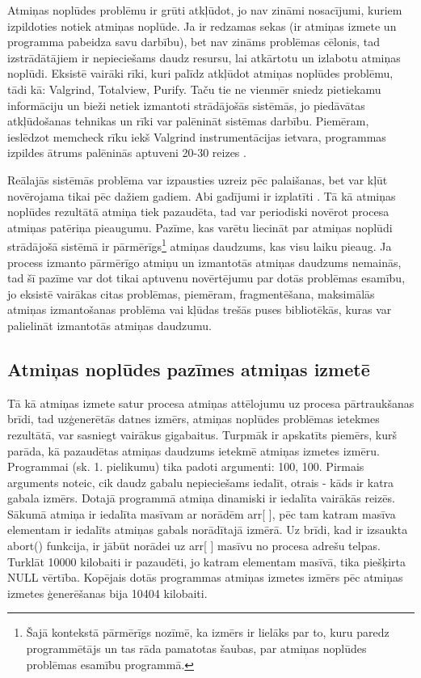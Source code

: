 Atmiņas noplūdes problēmu ir grūti atkļūdot,  jo nav zināmi nosacījumi, kuriem izpildoties notiek atmiņas noplūde. 
Ja ir redzamas sekas (ir atmiņas izmete un programma pabeidza savu darbību), bet nav zināms problēmas cēlonis, tad izstrādātājiem ir nepieciešams daudz resursu, lai atkārtotu un izlabotu atmiņas noplūdi. 
Eksistē vairāki rīki, kuri palīdz atkļūdot atmiņas noplūdes problēmu, tādi kā: Valgrind, Totalview, Purify.
Taču tie ne vienmēr sniedz pietiekamu informāciju un bieži netiek izmantoti strādājošās sistēmās, jo piedāvātas atkļūdošanas tehnikas un rīki var palēnināt sistēmas darbību.
Piemēram, ieslēdzot  memcheck rīku iekš Valgrind instrumentācijas ietvara, programmas izpildes ātrums palēninās aptuveni 20-30 reizes \cite{UVD}.

Reālajās sistēmās problēma var izpausties uzreiz pēc palaišanas, bet var kļūt novērojama tikai pēc dažiem gadiem. 
Abi gadījumi ir izplatīti \cite{HTTM}.
Tā kā atmiņas noplūdes rezultātā atmiņa tiek pazaudēta, tad var periodiski novērot procesa atmiņas patēriņa pieaugumu.
Pazīme, kas varētu liecināt par atmiņas noplūdi strādājošā sistēmā ir pārmērīgs\footnote{Šajā kontekstā pārmērīgs nozīmē, ka izmērs ir lielāks par to, kuru paredz programmētājs un tas rāda pamatotas šaubas, par atmiņas noplūdes problēmas esamību programmā.}
atmiņas daudzums, kas visu laiku pieaug. 
Ja process izmanto pārmērīgo atmiņu un izmantotās atmiņas daudzums nemainās, tad šī pazīme var dot tikai aptuvenu novērtējumu par dotās problēmas esamību, jo eksistē vairākas citas problēmas, piemēram, fragmentēšana, maksimālās atmiņas izmantošanas problēma vai kļūdas trešās puses bibliotēkās, kuras var palielināt izmantotās atmiņas daudzumu.

\subsection{Atmiņas noplūdes pazīmes atmiņas izmetē}
Tā kā atmiņas izmete satur procesa atmiņas attēlojumu uz procesa pārtraukšanas brīdi, tad uzģenerētās datnes izmērs, atmiņas noplūdes problēmas ietekmes rezultātā, var sasniegt vairākus gigabaitus.
Turpmāk ir apskatīts piemērs, kurš parāda, kā pazaudētas atmiņas daudzums ietekmē atmiņas izmetes izmēru.
Programmai (sk. 1. pielikumu) tika padoti argumenti: 100, 100. 
Pirmais arguments noteic, cik daudz gabalu nepieciešams iedalīt, otrais - kāds ir katra gabala izmērs.
Dotajā programmā atmiņa dinamiski ir iedalīta vairākās reizēs. 
Sākumā atmiņa ir iedalīta masīvam ar norādēm arr[ ], pēc tam katram masīva elementam ir iedalīts atmiņas gabals norādītajā izmērā.
Uz brīdi, kad ir izsaukta abort() funkcija, ir jābūt norādei uz arr[ ] masīvu no procesa adrešu telpas.
Turklāt 10000 kilobaiti ir pazaudēti, jo  katram elementam masīvā, tika piešķirta NULL vērtība. 
Kopējais dotās programmas atmiņas izmetes izmērs pēc atmiņas izmetes ģenerēšanas bija 10404 kilobaiti.

